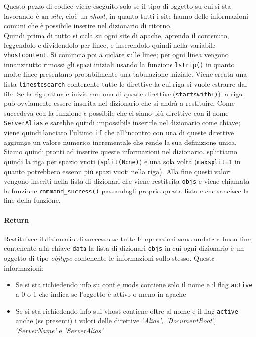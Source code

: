 \documentclass[11pt]{article}
\begin{document}
Questo pezzo di codice viene eseguito solo se il tipo di oggetto su cui si sta lavorando è un \textit{site}, cioè
un \textit{vhost}, in quanto tutti i site hanno delle informazioni comuni che è possibile inserire nel dizionario di ritorno.\\
Quindi prima di tutto si cicla su ogni site di apache, aprendo il contenuto, leggendolo e dividendolo per linee, e inserendolo quindi
nella variabile \texttt{vhostcontent}. Si comincia poi a ciclare sulle linee; per ogni linea vengono innanzitutto
rimossi gli spazi iniziali usando la funzione \texttt{lstrip()} in quanto molte linee presentano probabilmente una
tabulazione iniziale. Viene creata una lista \texttt{linestosearch} contenente tutte le direttive la cui riga si vuole estrarre dal file.
Se la riga attuale inizia con una di queste direttive (\texttt{startswith()}) la riga può ovviamente essere inserita
nel dizionario che si andrà a restituire. Come succedeva con la funzione  è possibile che ci siano
più direttive con il nome \texttt{ServerAlias} e sarebbe quindi impossibile inserirle nel dizionario come chiave; viene quindi
lanciato l'ultimo \texttt{if} che all'incontro con una di queste direttive aggiunge un valore numerico incrementale
che rende la sua definizione unica. Siamo quindi pronti ad inserire queste informazioni nel dizionario. splittiamo quindi
la riga per spazio vuoti (\texttt{split(None)}) e una sola volta (\texttt{maxsplit=1} in quanto potrebbero esserci più spazi
vuoti nella riga). Alla fine questi valori vengono inseriti nella lista di dizionari che viene restituita \texttt{objs}
e viene chiamata la funzione \texttt{command\_success()} passandogli proprio questa lista e che sancisce la fine della funzione.
\paragraph{Return}
Restituisce il dizionario di successo se tutte le operazioni sono andate a buon fine, contenente alla chiave \texttt{data} la
lista di dizionari \texttt{objs} in cui ogni dizionario è un oggetto di tipo \textit{objtype} contenente le informazioni
sullo stesso. Queste informazioni:
\begin{itemize}
	\item{Se si sta richiedendo info su conf e mods contiene solo il nome e il flag \texttt{active} a 0 o 1 che indica se
		l'oggetto è attivo o meno in apache}
	\item{Se si sta richiedendo info sui vhost contiene oltre al nome e il flag \texttt{active} anche (se presenti)
		i valori delle direttive  \textit{'Alias', 'DocumentRoot', 'ServerName'} e \textit{'ServerAlias'}}
\end{itemize}
\end{document}
